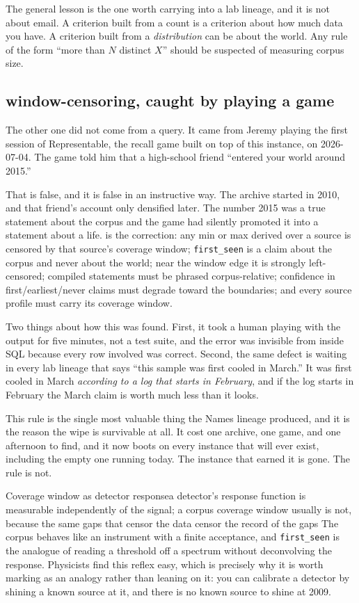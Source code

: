 The general lesson is the one worth carrying into a lab lineage, and it is not about email. A criterion built from a count is a criterion about how much data you have. A criterion built from a \emph{distribution} can be about the world. Any rule of the form ``more than $N$ distinct $X$'' should be suspected of measuring corpus size.

\subsection{window-censoring, caught by playing a game}

The other one did not come from a query. It came from Jeremy playing the first session of Representable, the recall game built on top of this instance, on 2026-07-04. The game told him that a high-school friend ``entered your world around 2015.''

That is false, and it is false in an instructive way. The archive started in 2010, and that friend's account only densified later. The number 2015 was a true statement about the corpus and the game had silently promoted it into a statement about a life.  is the correction: any min or max derived over a source is censored by that source's coverage window; \texttt{first\_seen} is a claim about the corpus and never about the world; near the window edge it is strongly left-censored; compiled statements must be phrased corpus-relative; confidence in first/earliest/never claims must degrade toward the boundaries; and every source profile must carry its coverage window.

Two things about how this was found. First, it took a human playing with the output for five minutes, not a test suite, and the error was invisible from inside SQL because every row involved was correct. Second, the same defect is waiting in every lab lineage that says ``this sample was first cooled in March.'' It was first cooled in March \emph{according to a log that starts in February}, and if the log starts in February the March claim is worth much less than it looks.

This rule is the single most valuable thing the Names lineage produced, and it is the reason the wipe is survivable at all. It cost one archive, one game, and one afternoon to find, and it now boots on every instance that will ever exist, including the empty one running today. The instance that earned it is gone. The rule is not.

\begin{Analogy}{Coverage window as detector response}{a detector's response function is measurable independently of the signal; a corpus coverage window usually is not, because the same gaps that censor the data censor the record of the gaps}
The corpus behaves like an instrument with a finite acceptance, and \texttt{first\_seen} is the analogue of reading a threshold off a spectrum without deconvolving the response. Physicists find this reflex easy, which is precisely why it is worth marking as an analogy rather than leaning on it: you can calibrate a detector by shining a known source at it, and there is no known source to shine at 2009.
\end{Analogy}

